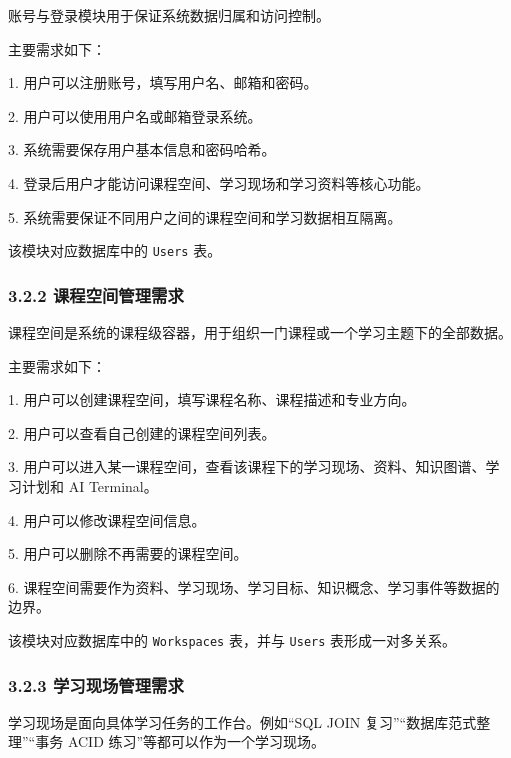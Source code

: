 \documentclass[10pt,a4paper,fontset=none]{ctexart}
\begin{document}
账号与登录模块用于保证系统数据归属和访问控制。\par

主要需求如下：\par

1. 用户可以注册账号，填写用户名、邮箱和密码。\par
2. 用户可以使用用户名或邮箱登录系统。\par
3. 系统需要保存用户基本信息和密码哈希。\par
4. 登录后用户才能访问课程空间、学习现场和学习资料等核心功能。\par
5. 系统需要保证不同用户之间的课程空间和学习数据相互隔离。\par

该模块对应数据库中的 \texttt{Users} 表。\par

\subsubsection*{3.2.2 课程空间管理需求}

课程空间是系统的课程级容器，用于组织一门课程或一个学习主题下的全部数据。\par

主要需求如下：\par

1. 用户可以创建课程空间，填写课程名称、课程描述和专业方向。\par
2. 用户可以查看自己创建的课程空间列表。\par
3. 用户可以进入某一课程空间，查看该课程下的学习现场、资料、知识图谱、学习计划和 AI Terminal。\par
4. 用户可以修改课程空间信息。\par
5. 用户可以删除不再需要的课程空间。\par
6. 课程空间需要作为资料、学习现场、学习目标、知识概念、学习事件等数据的边界。\par

该模块对应数据库中的 \texttt{Workspaces} 表，并与 \texttt{Users} 表形成一对多关系。\par

\subsubsection*{3.2.3 学习现场管理需求}

学习现场是面向具体学习任务的工作台。例如“SQL JOIN 复习”“数据库范式整理”“事务 ACID 练习”等都可以作为一个学习现场。\par
\end{document}
